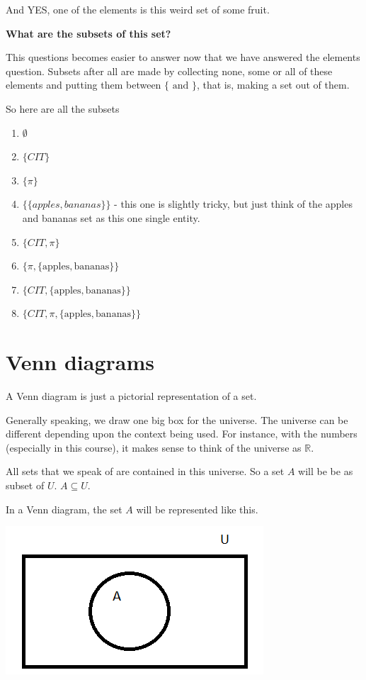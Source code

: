 \documentclass[12pt]{article}
\begin{document}
And YES, one of the elements is this weird set of some fruit.

\medskip

\textbf{What are the subsets of this set?}

This questions becomes easier to answer now that we have answered the elements question. Subsets after all are made by collecting none, some or all of these elements and putting them between $\{ \text{ and } \}$, that is, making a set out of them.

So here are all the subsets
\begin{enumerate}
\item $\emptyset$
\item $\{CIT\}$
\item $\{\pi\}$
\item $\{\{apples, bananas\}\}$ - this one is slightly tricky, but just think of the apples and bananas set as this one single entity.
\item $\{CIT, \pi\}$
\item $\{\pi, \{\text{apples}, \text{bananas} \} \}$
\item $\{CIT, \{\text{apples}, \text{bananas} \} \}$
\item $\{CIT, \pi , \{\text{apples}, \text{bananas} \} \}$
\end{enumerate}


\section*{Venn diagrams}

A Venn diagram is just a pictorial representation of a set.

Generally speaking, we draw one big box for the universe. The universe can be different depending upon the context being used. For instance, with the numbers (especially in this course), it makes sense to think of the universe as $\mathbb{R}$.

All sets that we speak of are contained in this universe. So a set $A$ will be 
be as subset of $U$. $ A \subseteq U$.

In a Venn diagram, the set $A$ will be represented like this.

\includegraphics{./img/BasicVenn.png}
\end{document}

